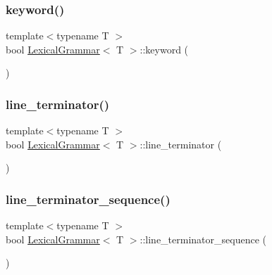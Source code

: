\mbox{\label{class_lexical_grammar_a609dc2ff60d85011034954b805ebd077}} 
\subsubsection{\texorpdfstring{keyword()}{keyword()}}
{\footnotesize\ttfamily template$<$typename T $>$ \\
bool \hyperlink{class_lexical_grammar}{Lexical\+Grammar}$<$ T $>$\+::keyword (\begin{DoxyParamCaption}{ }\end{DoxyParamCaption})\hspace{0.3cm}{\ttfamily [inline]}}

\mbox{\label{class_lexical_grammar_ab0cbd5b59a7478d0f1042774b877714d}} 
\subsubsection{\texorpdfstring{line\+\_\+terminator()}{line\_terminator()}}
{\footnotesize\ttfamily template$<$typename T $>$ \\
bool \hyperlink{class_lexical_grammar}{Lexical\+Grammar}$<$ T $>$\+::line\+\_\+terminator (\begin{DoxyParamCaption}{ }\end{DoxyParamCaption})\hspace{0.3cm}{\ttfamily [inline]}}

\mbox{\label{class_lexical_grammar_a43737fd87e454c3a426c047b02f376f6}} 
\subsubsection{\texorpdfstring{line\+\_\+terminator\+\_\+sequence()}{line\_terminator\_sequence()}}
{\footnotesize\ttfamily template$<$typename T $>$ \\
bool \hyperlink{class_lexical_grammar}{Lexical\+Grammar}$<$ T $>$\+::line\+\_\+terminator\+\_\+sequence (\begin{DoxyParamCaption}{ }\end{DoxyParamCaption})\hspace{0.3cm}{\ttfamily [inline]}}

